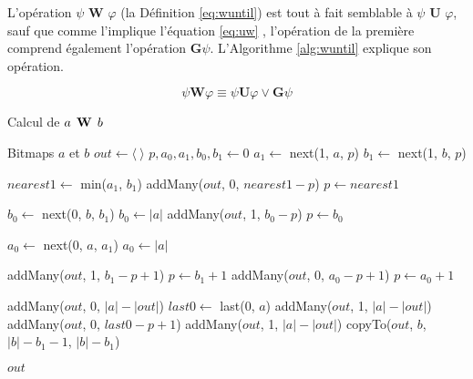 L'opération $\psi \textbf{ W } \varphi$ (la Définition \eqref{eq:wuntil}) est tout à fait semblable à $\psi \textbf{ U } \varphi$, sauf que comme l'implique l'équation \eqref{eq:uw} \citep{huth2004}, l'opération de la première comprend également l'opération $\textbf{G}\psi$. L'Algorithme \ref{alg:wuntil} explique son opération.

\begin{equation} \label{eq:uw}
\psi \textbf{W} \varphi \equiv \psi \textbf{U} \varphi \vee \textbf{G}\psi
\end{equation}

\begin{algorithm}
\caption{Calcul de $a \mathrel{\mbox{\,\textbf{W}}}\, b$}
\label{alg:wuntil}
\begin{multicols}{2}
\begin{algorithmic}[1]
\Require Bitmaps $a$ et $b$
\State $out \gets \langle~\rangle$
\State $p, a_0, a_1, b_0, b_1 \gets 0$
    \State $a_1 \gets$ next(1, $a$, $p$)
  \EndIf
    \State $b_1 \gets$ next(1, $b$, $p$)
  \EndIf
    \BreakWhile
  \EndIf

  \State $nearest1 \gets$ min($a_1$, $b_1$)
    \State addMany($out$, 0, $nearest1 - p$)
    \State $p \gets nearest1$
    \Continue
  \EndIf

      \State $b_0 \gets$ next(0, $b$, $b_1$)
        \State $b_0 \gets |a|$
      \EndIf
    \EndIf
    \State addMany($out$, 1, $b_0 - p$)
    \State $p \gets b_0$
    \Continue
  \EndIf

    \State  $a_0 \gets$ next(0, $a$, $a_1$)
      \State $a_0 \gets |a|$
    \EndIf
  \EndIf

    \State addMany($out$, 1, $b_1 - p + 1$)
    \State $p \gets b_1 + 1$
  \Else
    \State addMany($out$, 0, $a_0 - p + 1$)
    \State $p \gets a_0 + 1$
  \EndIf
\EndWhile

    \State addMany($out$, 0, $|a| - |out|$)
  \Else
    \State $last0 \gets$ last(0, $a$)
      \State addMany($out$, 1, $|a| - |out|$)
    \Else
      \State addMany($out$, 0, $last0 - p + 1$)
      \State addMany($out$, 1, $|a| - |out|$)
    \EndIf
  \EndIf
{}
  \State copyTo($out$, $b$, $|b| - b_1 - 1$, $|b| - b_1$)
\EndIf

\State \Return $out$
\end{algorithmic}
\end{multicols}
\end{algorithm}

